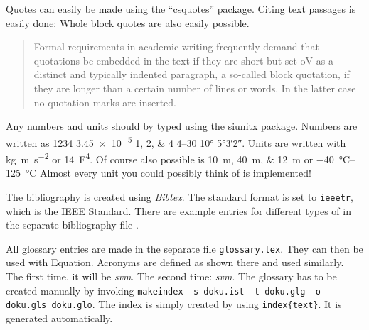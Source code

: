 Quotes can easily be made using the \enquote{csquotes} package.
Citing text passages is easily done:  Whole block quotes are also easily 
possible.

\blockquote{Formal requirements in academic writing frequently demand that
quotations be embedded in the text if they are short but set oV as a distinct
and typically indented paragraph, a so-called block quotation, if they are
longer than a certain number of lines or words. In the latter case no quotation
marks are inserted.}

Any numbers and units should by typed using the siunitx package.
Numbers are written as \num{1234} \num{3.45e-5} \numlist{1;2;4} \numrange{4}{30} \ang{10} \ang{5;3;2}.
Units are written with \si{\kilo\gram\meter\per\square\second} or \SI{14}{\farad\tothe{4}}.
Of course also possible is \SIlist{10;40;12}{\meter} or \SIrange{-40}{+125}{\degreeCelsius}
Almost every unit you could possibly think of is implemented!

The bibliography is created using \emph{Bibtex}. The
standard format is set to \texttt{ieeetr}, which is the IEEE Standard. There
are example entries for different types of  in the separate bibliography file
\cite{article} \cite{book} \cite{booklet} \cite{conference} \cite{inbook}
\cite{incollection} \cite{manual} \cite{mastersthesis} \cite{misc}
\cite{phdthesis} \cite{proceedings} \cite{techreport} \cite{unpublished}.

All glossary entries are made in the separate file \texttt{glossary.tex}.
They can then be used with \gls{Equation}.
Acronyms are defined as shown there and used similarly. 
The first time, it will be \emph{\gls{svm}}.
The second time: \emph{\gls{svm}}.
The glossary has to be created manually by invoking \texttt{makeindex -s doku.ist -t doku.glg -o doku.gls doku.glo}.
The index is simply created by using \texttt{index\{text\}}. It is generated automatically.